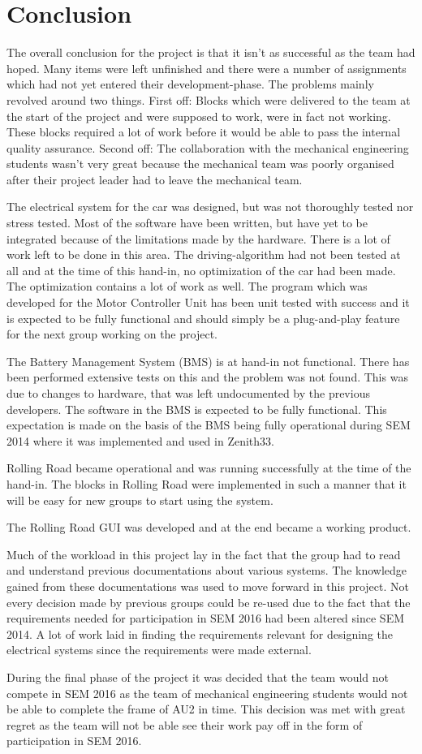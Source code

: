 \chapter{Conclusion}
The overall conclusion for the project is that it isn't as successful as the team had hoped. Many items were left unfinished and there were a number of assignments which had not yet entered their development-phase. The problems mainly revolved around two things. First off: Blocks which were delivered to the team at the start of the project and were supposed to work, were in fact not working. These blocks required a lot of work before it would be able to pass the internal quality assurance. Second off: The collaboration with the mechanical engineering students wasn't very great because the mechanical team was poorly organised after their project leader had to leave the mechanical team.

The electrical system for the car was designed, but was not thoroughly tested nor stress tested. Most of the software have been written, but have yet to be integrated because of the limitations made by the hardware. There is a lot of work left to be done in this area. The driving-algorithm had not been tested at all and at the time of this hand-in, no optimization of the car had been made. The optimization contains a lot of work as well. The program which was developed for the Motor Controller Unit has been unit tested with success and it is expected to be fully functional and should simply be a plug-and-play feature for the next group working on the project. 

The Battery Management System (BMS) is at hand-in not functional. There has been performed extensive tests on this and the problem was not found. This was due to changes to hardware, that was left undocumented by the previous developers. The software in the BMS is expected to be fully functional. This expectation is made on the basis of the BMS being fully operational during SEM 2014 where it was implemented and used in Zenith33.

Rolling Road became operational and was running successfully at the time of the hand-in. The blocks in Rolling Road were implemented in such a manner that it will be easy for new groups to start using the system. 

The Rolling Road GUI was developed and at the end became a working product.

Much of the workload in this project lay in the fact that the group had to read and understand previous documentations about various systems. The knowledge gained from these documentations was used to move forward in this project. Not every decision made by previous groups could be re-used due to the fact that the requirements needed for participation in SEM 2016 had been altered since SEM 2014. A lot of work laid in finding the requirements relevant for designing the electrical systems since the requirements were made external.

During the final phase of the project it was decided that the team would not compete in SEM 2016 as the team of mechanical engineering students would not be able to complete the frame of AU2 in time. This decision was met with great regret as the team will not be able see their work pay off in the form of participation in SEM 2016.